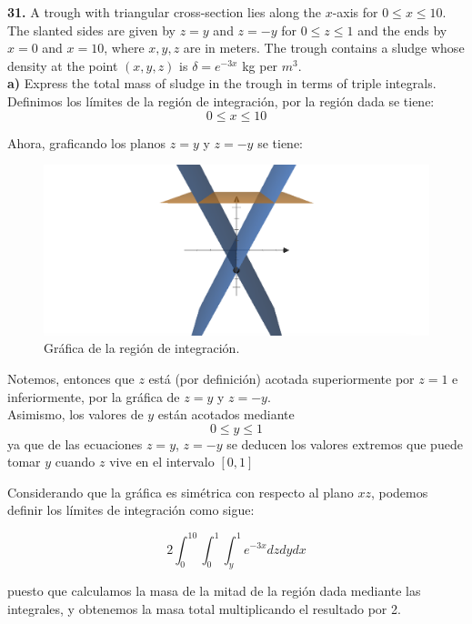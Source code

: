 \documentclass[11pt]{report}
\begin{document}
\textbf{31.} A trough with triangular cross-section lies along the $x$-axis for
$0 \leq x \leq 10$. The slanted sides are given by $z = y$ and $z = -y$ for
$0 \leq z \leq 1$ and the ends by $x = 0$ and $x = 10$, where $x, y, z$ are in meters.
The trough contains a sludge whose density at the point $(x, y, z)$ is
$\delta = e^{-3x}$ kg per $m^3$. \\

\textbf{a)} Express the total mass of sludge in the trough in terms of triple
integrals. \\

Definimos los límites de la región de integración, por la región dada se tiene:
	$$ 0 \leq x \leq 10 $$

Ahora, graficando los planos $z = y$ y $z = -y$ se tiene:

\begin{figure}[H]
	\includegraphics[scale=0.3]{intregion.png}
	\centering
	\caption{Gráfica de la región de integración.}
	\centering
\end{figure}

Notemos, entonces que $z$ está (por definición) acotada superiormente por
$z = 1$ e inferiormente, por la gráfica de $z = y$ y $z = -y$.\\

Asimismo, los valores de $y$ están acotados mediante
	$$ 0 \leq y \leq 1$$
ya que de las ecuaciones $z = y$, $z = -y$ se deducen los valores extremos
que puede tomar $y$ cuando $z$ vive en el intervalo $[0,1]$

Considerando que la gráfica es simétrica con respecto al plano $xz$, podemos
definir los límites de integración como sigue:

	$$ 2 \int_{0}^{10}\int_{0}^{1}\int_{y}^{1} e^{-3x} dz dy dx  $$

puesto que calculamos la masa de la mitad de la región dada mediante las integrales,
y obtenemos la masa total multiplicando el resultado por 2.
\end{document}
